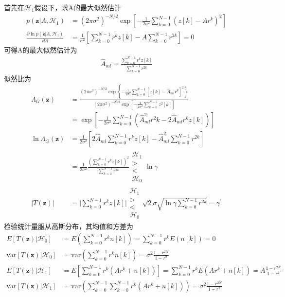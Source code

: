 \documentclass[fontset=windows]{article}
\numberwithin{figure}{section}
\begin{document}
首先在\(\mathcal{H}_1\)假设下，求A的最大似然估计
\begin{align*}
	p(\mathbf{z}|A,\mathcal{H}_1)
	 & =(2\pi \sigma^2)^{-N/2}
	\exp\left[-\frac{1}{2\sigma^2}\sum_{k=0}^{N-1}(z[k]-Ar^k)^2\right]                   \\
	\frac{\partial \ln p(\mathbf{z}|A,\mathcal{H}_1)}{\partial A}
	 & =\frac{1}{\sigma^2}\left[\sum_{k=0}^{N-1}r^kz[k]-A\sum_{k=0}^{N-1}r^{2k}\right]=0
\end{align*}
可得A的最大似然估计为
\begin{align*}
	\hat{A}_{ml}=\frac{\sum_{k=0}^{N-1}r^kz[k]}{\sum_{k=0}^{N-1}r^{2k}}
\end{align*}
似然比为
\begin{align*}
	\Lambda_{G}(\mathbf{z})
	 & =\frac{(2\pi \sigma^2)^{-N/2}
	\exp\left\{-\frac{1}{2\sigma^2}\sum_{k=0}^{N-1}\left[z[k]-\hat{A}_{ml}r^{k}\right]^2 \right\}}
	{(2\pi \sigma^2)^{-N/2}\exp\left[-\frac{1}{2\sigma^2}\sum_{k=0}^{N-1}z^2[k] \right]}                          \\
	 & =\exp\left[-\frac{1}{2\sigma^2}\sum_{k=0}^{N-1}(\hat{A}^2_{ml}r^2k-2\hat{A}_{ml}r^kz[k])\right]            \\
	\ln \Lambda_G(\mathbf{z})
	 & =\frac{1}{2\sigma^2}\left[2\hat{A}_{ml}\sum_{k=0}^{N-1}r^kz[k]-\hat{A}^2_{ml}\sum_{k=0}^{N-1}r^{2k}\right] \\
	 & =\frac{1}{2\sigma^2}\frac{\left(\sum_{k=0}^{N-1}r^kz[k]\right)^2}{\sum_{k=0}^{N-1}r^{2k}}
	\begin{matrix}
		\mathcal{H}_1 \\>\\<\\\mathcal{H}_0
	\end{matrix}                                                                            \ln \gamma            \\
	\vert T(\mathbf{z})\vert
	 & =\vert \sum_{k=0}^{N-1}r^kz[k]\vert
	\begin{matrix}
		\mathcal{H}_1 \\>\\<\\\mathcal{H}_0
	\end{matrix}
	\sqrt{2}\sigma\sqrt{\ln \gamma\sum_{k=0}^{N-1}r^{2k}}=\gamma^{\prime}
\end{align*}
检验统计量服从高斯分布，其均值和方差为
\begin{align*}
	E[T(\mathbf{z})|\mathcal{H}_0]
	 & =E(\sum_{k=0}^{N-1}r^kn[k])=\sum_{k=0}^{N-1}r^kE(n[k])=0               \\
	\text{var}[T(\mathbf{z})|\mathcal{H}_0]
	 & =\text{var}(\sum_{k=0}^{N-1}r^kn[k])=\sigma^2\frac{1-r^{2N}}{1-r^2}    \\
	E[T(\mathbf{z})|\mathcal{H}_1]
	 & =E\left[\sum_{k=0}^{N-1}r^k(Ar^k+n[k])\right]
	=\sum_{k=0}^{N-1}r^kE(Ar^k+n[k])=A\frac{1-r^{2N}}{1-r^2}                  \\
	\text{var}\left[T(\mathbf{z})|\mathcal{H}_1\right]
	 & =\text{var}\left(\sum_{k=0}^{N-1}\sum_{k=0}^{N-1}r^k(Ar^k+n[k])\right)
	=\sigma^2\frac{1-r^{2N}}{1-r^2}
\end{align*}
\end{document}
